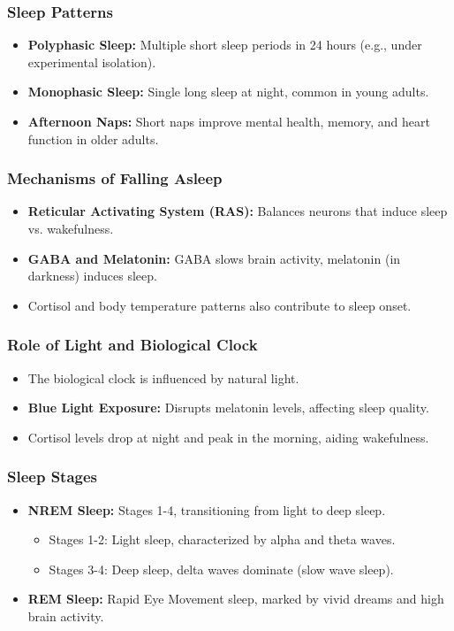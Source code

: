 \begin{frame}[fragile]\frametitle{Sleep Patterns}
    \begin{itemize}
        \item \textbf{Polyphasic Sleep:} Multiple short sleep periods in 24 hours (e.g., under experimental isolation).
        \item \textbf{Monophasic Sleep:} Single long sleep at night, common in young adults.
        \item \textbf{Afternoon Naps:} Short naps improve mental health, memory, and heart function in older adults.
    \end{itemize}
\end{frame}

\begin{frame}[fragile]\frametitle{Mechanisms of Falling Asleep}
    \begin{itemize}
        \item \textbf{Reticular Activating System (RAS):} Balances neurons that induce sleep vs. wakefulness.
        \item \textbf{GABA and Melatonin:} GABA slows brain activity, melatonin (in darkness) induces sleep.
        \item Cortisol and body temperature patterns also contribute to sleep onset.
    \end{itemize}
\end{frame}

\begin{frame}[fragile]\frametitle{Role of Light and Biological Clock}
    \begin{itemize}
        \item The biological clock is influenced by natural light.
        \item \textbf{Blue Light Exposure:} Disrupts melatonin levels, affecting sleep quality.
        \item Cortisol levels drop at night and peak in the morning, aiding wakefulness.
    \end{itemize}
\end{frame}

\begin{frame}[fragile]\frametitle{Sleep Stages}
    \begin{itemize}
        \item \textbf{NREM Sleep:} Stages 1-4, transitioning from light to deep sleep.
        \begin{itemize}
            \item Stages 1-2: Light sleep, characterized by alpha and theta waves.
            \item Stages 3-4: Deep sleep, delta waves dominate (slow wave sleep).
        \end{itemize}
        \item \textbf{REM Sleep:} Rapid Eye Movement sleep, marked by vivid dreams and high brain activity.
    \end{itemize}
\end{frame}

